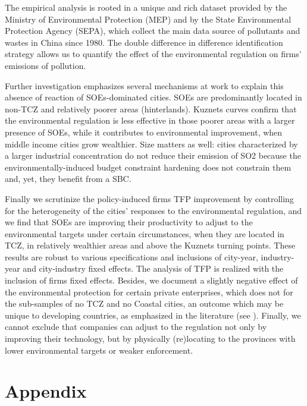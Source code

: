 \documentclass[12pt]{article}
\begin{document}
The empirical analysis is rooted in a unique and rich dataset provided by the Ministry of Environmental Protection (MEP) and by the State Environmental Protection Agency (SEPA), which collect the main data source of pollutants and wastes in China since 1980. The double difference in difference identification strategy allows us to quantify the effect of the environmental regulation on firms' emissions of pollution. 


Further investigation emphasizes several mechanisms at work to explain this absence of reaction of SOEs-dominated cities. SOEs are predominantly located in non-TCZ and relatively poorer areas (hinterlands). Kuznets curves confirm that the environmental regulation is less effective in those poorer areas with a larger presence of SOEs, while it contributes to environmental improvement, when middle income cities grow wealthier. Size matters as well: cities characterized by a larger industrial concentration do not reduce their emission of SO2 because the environmentally-induced budget constraint hardening does not constrain them and, yet, they benefit from a SBC. 


Finally we scrutinize the policy-induced firms TFP improvement by controlling for the heterogeneity of the cities' responses to the environmental regulation, and we find that SOEs are improving their productivity to adjust to the environmental targets under certain circumstances, when they are located in TCZ, in relatively wealthier areas and above the Kuznets turning points. These results are robust to various specifications and inclusions of city-year, industry-year and city-industry fixed effects. The analysis of TFP is realized with the inclusion of firms fixed effects. Besides, we document a slightly negative effect of the environmental protection for certain private enterprises, which does not for the sub-samples of no TCZ and no Coastal cities, an outcome which may be unique to developing countries, as emphasized in the literature (see \cite{Jefferson2013-az}). Finally, we cannot exclude that companies can adjust to the regulation not only by improving their technology, but by physically (re)locating to the provinces with lower environmental targets or weaker enforcement.

%
%



\section{Appendix} \label{appendix}
\end{document}
